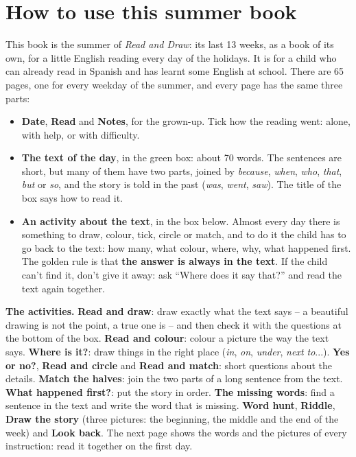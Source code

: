 \section*{How to use this summer book}

This book is the summer of \textit{Read and Draw}: its last 13 weeks,
as a book of its own, for a little English reading every day of the
holidays. It is for a child who can already read in Spanish and has
learnt some English at school. There are 65 pages, one for every
weekday of the summer, and every page has the same three parts:

\begin{itemize}[leftmargin=6mm, itemsep=1mm]
\item \textbf{Date}, \textbf{Read} and \textbf{Notes}, for the grown-up.
  Tick how the reading went: alone, with help, or with difficulty.
\item \textbf{The text of the day}, in the green box: about 70 words.
  The sentences are short, but many of them have two parts, joined by
  \textit{because}, \textit{when}, \textit{who}, \textit{that},
  \textit{but} or \textit{so}, and the story is told in the past
  (\textit{was}, \textit{went}, \textit{saw}). The title of the box says
  how to read it.
\item \textbf{An activity about the text}, in the box below. Almost every
  day there is something to draw, colour, tick, circle or match, and to
  do it the child has to go back to the text: how many, what colour,
  where, why, what happened first. The golden rule is that \textbf{the
  answer is always in the text}. If the child can't find it, don't give
  it away: ask ``Where does it say that?'' and read the text again
  together.
\end{itemize}

\textbf{The activities.} \textbf{Read and draw}: draw exactly what the
text says -- a beautiful drawing is not the point, a true one is -- and
then check it with the questions at the bottom of the box.
\textbf{Read and colour}: colour a picture the way the text says.
\textbf{Where is it?}: draw things in the right place (\textit{in},
\textit{on}, \textit{under}, \textit{next to}...). \textbf{Yes or no?},
\textbf{Read and circle} and \textbf{Read and match}: short questions
about the details. \textbf{Match the halves}: join the two parts of a
long sentence from the text. \textbf{What happened first?}: put the
story in order. \textbf{The missing words}: find a sentence in the text
and write the word that is missing. \textbf{Word hunt}, \textbf{Riddle},
\textbf{Draw the story} (three pictures: the beginning, the middle and the
end of the week) and \textbf{Look back}. The next page shows the words
and the pictures of every instruction: read it together on the first
day.

